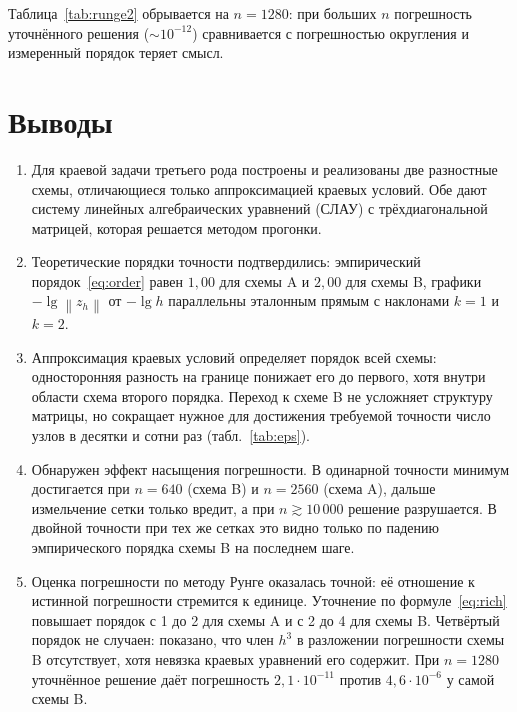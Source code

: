 \documentclass[12pt,a4paper]{article}
\newcommand{\norm}[1]{\left\|#1\right\|}
\begin{document}
Таблица~\ref{tab:runge2} обрывается на $n=1280$: при больших $n$
погрешность уточнённого решения ($\sim10^{-12}$) сравнивается с
погрешностью округления и измеренный порядок теряет смысл.

\section{Выводы}

\begin{enumerate}
\item Для краевой задачи третьего рода построены и реализованы две
разностные схемы, отличающиеся только аппроксимацией краевых условий.
Обе дают систему линейных алгебраических уравнений (СЛАУ) с
трёхдиагональной матрицей, которая решается методом прогонки.

\item Теоретические порядки точности подтвердились: эмпирический
порядок~\eqref{eq:order} равен $1{,}00$ для схемы A и $2{,}00$ для схемы
B, графики $-\lg\norm{z_h}$ от $-\lg h$ параллельны эталонным прямым с
наклонами $k=1$ и $k=2$.

\item Аппроксимация краевых условий определяет порядок всей схемы:
односторонняя разность на границе понижает его до первого, хотя внутри
области схема второго порядка. Переход к схеме B не усложняет структуру
матрицы, но сокращает нужное для достижения требуемой точности число
узлов в десятки и сотни раз (табл.~\ref{tab:eps}).

\item Обнаружен эффект насыщения погрешности. В одинарной точности
минимум достигается при $n=640$ (схема B) и $n=2560$ (схема A), дальше
измельчение сетки только вредит, а при $n\gtrsim 10\,000$ решение
разрушается. В двойной точности при тех же сетках это видно только по
падению эмпирического порядка схемы B на последнем шаге.

\item Оценка погрешности по методу Рунге оказалась точной: её отношение
к истинной погрешности стремится к единице. Уточнение по
формуле~\eqref{eq:rich} повышает порядок с 1 до 2 для схемы A и с 2 до 4
для схемы B. Четвёртый порядок не случаен: показано, что член $h^3$ в
разложении погрешности схемы B отсутствует, хотя невязка краевых
уравнений его содержит. При $n=1280$ уточнённое решение даёт погрешность
$2{,}1\cdot10^{-11}$ против $4{,}6\cdot10^{-6}$ у самой схемы B.
\end{enumerate}
\end{document}
